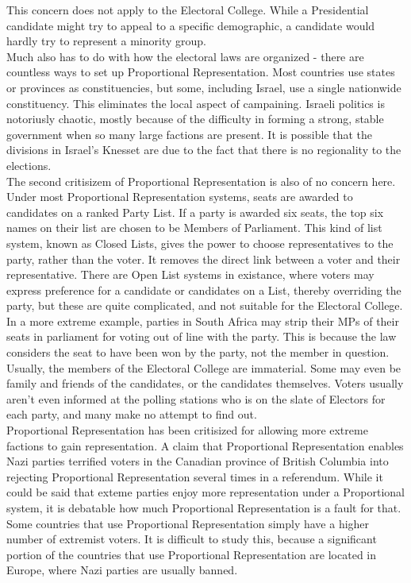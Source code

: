\documentclass{article}
\begin{document}
    This concern does not apply to the Electoral College. While a Presidential candidate might try to appeal to a specific demographic, a candidate would hardly try to represent a minority group.\\

    Much also has to do with how the electoral laws are organized - there are countless ways to set up Proportional Representation. Most countries use states or provinces as constituencies, but some, including Israel, use a single nationwide constituency. This eliminates the local aspect of campaining. Israeli politics is notoriusly chaotic, mostly because of the difficulty in forming a strong, stable government when so many large factions are present. It is possible that the divisions in Israel's Knesset are due to the fact that there is no regionality to the elections.\\

    The second critisizem of Proportional Representation is also of no concern here. Under most Proportional Representation systems, seats are awarded to candidates on a ranked Party List. If a party is awarded six seats, the top six names on their list are chosen to be Members of Parliament. This kind of list system, known as Closed Lists, gives the power to choose representatives to the party, rather than the voter. It removes the direct link between a voter and their representative. There are Open List systems in existance, where voters may express preference for a candidate or candidates on a List, thereby overriding the party, but these are quite complicated, and not suitable for the Electoral College.\\

    In a more extreme example, parties in South Africa may strip their MPs of their seats in parliament for voting out of line with the party. This is because the law considers the seat to have been won by the party, not the member in question.\\

    Usually, the members of the Electoral College are immaterial. Some may even be family and friends of the candidates, or the candidates themselves. Voters usually aren't even informed at the polling stations who is on the slate of Electors for each party, and many make no attempt to find out.\\

    Proportional Representation has been critisized for allowing more extreme factions to gain representation. A claim that Proportional Representation enables Nazi parties terrified voters in the Canadian province of British Columbia into rejecting Proportional Representation several times in a referendum. While it could be said that exteme parties enjoy more representation under a Proportional system, it is debatable how much Proportional Representation is a fault for that. Some countries that use Proportional Representation simply have a higher number of extremist voters. It is difficult to study this, because a significant portion of the countries that use Proportional Representation are located in Europe, where Nazi parties are usually banned.\\
\end{document}
